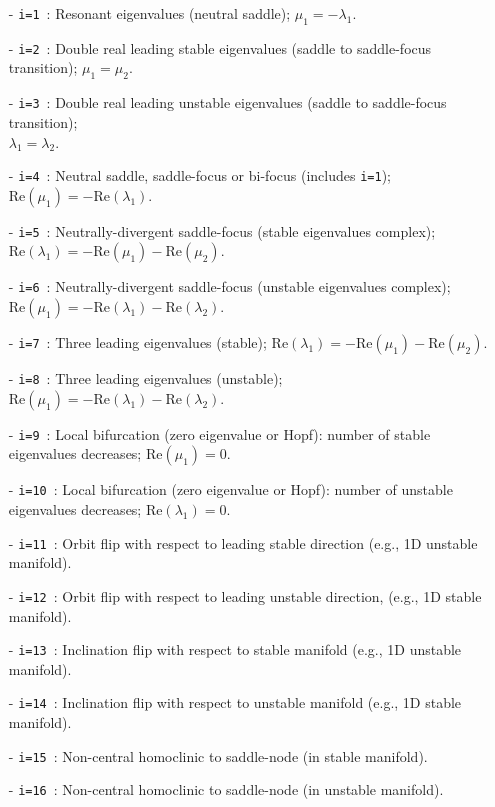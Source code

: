 \documentclass[12pt]{report}
\begin{document}
\begin{itemize}
\item[-] {\tt i=1}~: 
Resonant eigenvalues (neutral saddle); $\mu_1=-\lambda_1$.
\item[-] {\tt i=2}~: 
Double real leading stable eigenvalues (saddle to saddle-focus
transition); $\mu_1=\mu_2$. 
\item[-] {\tt i=3}~: 
Double real leading unstable eigenvalues (saddle to saddle-focus
transition);\\ 
$\lambda_1=\lambda_2$. 
\item[-] {\tt i=4}~: 
Neutral saddle, saddle-focus or bi-focus (includes {\tt i=1});
$\mbox{Re}(\mu_1)  =  - \mbox{Re}(\lambda_1)$. 
\item[-] {\tt i=5}~: 
Neutrally-divergent saddle-focus (stable eigenvalues complex);\\
$\mbox{Re}(\lambda_1) = - \mbox{Re}(\mu_1) - \mbox{Re}(\mu_2)$.
\item[-] {\tt i=6}~: 
Neutrally-divergent saddle-focus (unstable eigenvalues complex);\\
$\mbox{Re}(\mu_1) = - \mbox{Re}(\lambda_1) - \mbox{Re}(\lambda_2)$. 
\item[-] {\tt i=7}~: 
Three leading eigenvalues (stable);
$\mbox{Re}(\lambda_1) = - \mbox{Re}(\mu_1) - \mbox{Re}(\mu_2)$. 
\item[-] {\tt i=8}~: 
Three leading eigenvalues (unstable);
$\mbox{Re}(\mu_1) = - \mbox{Re}(\lambda_1) - \mbox{Re}(\lambda_2)$.
\item[-] {\tt i=9}~: 
Local bifurcation (zero eigenvalue or Hopf): 
number of stable eigenvalues decreases; $\mbox{Re}(\mu_1)=0$.
\item[-] {\tt i=10}~: 
Local bifurcation (zero eigenvalue or Hopf): 
number of unstable eigenvalues decreases; $\mbox{Re}(\lambda_1)=0$.
\item[-] {\tt i=11}~: 
Orbit flip with respect to leading stable direction 
(e.g., 1D unstable manifold).
\item[-] {\tt i=12}~: 
Orbit flip with respect to leading unstable direction, 
(e.g., 1D stable manifold).
\item[-] {\tt i=13}~: 
Inclination flip with respect to stable manifold
(e.g., 1D unstable manifold).
\item[-] {\tt i=14}~: 
Inclination flip with respect to unstable manifold
(e.g., 1D stable manifold).
\item[-] {\tt i=15}~: 
Non-central homoclinic to saddle-node (in stable manifold).
\item[-] {\tt i=16}~: 
Non-central homoclinic to saddle-node (in unstable manifold).
\end{itemize}
\end{document}

